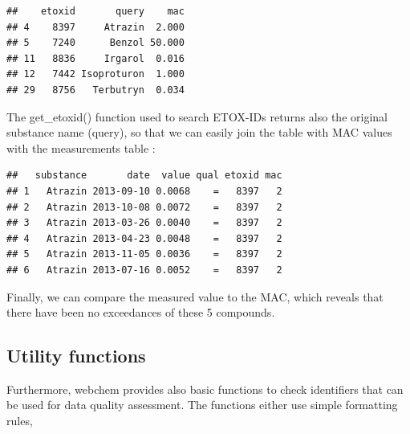 \begin{knitrout}
\color{fgcolor}\begin{kframe}
\begin{alltt}
 \hlkwb{<-} \hlstd{(ids, ids[}\hlopt{!} \hlopt{&} 
                      \hlstd{(}\hlstd{,} \hlstd{,} \hlstd{)]))}
\end{alltt}
\begin{verbatim}
##    etoxid       query    mac
## 4    8397     Atrazin  2.000
## 5    7240      Benzol 50.000
## 11   8836     Irgarol  0.016
## 12   7442 Isoproturon  1.000
## 29   8756   Terbutryn  0.034
\end{verbatim}
\end{kframe}
\end{knitrout}

The get\_etoxid() function used to search ETOX-IDs returns also the original substance name (query),
so that we can easily join the table with MAC values with the measurements table :
\begin{knitrout}
\color{fgcolor}\begin{kframe}
\begin{alltt}
 \hlkwb{<-}   \hlstd{=} \hlstd{,}  \hlstd{=} \hlstd{)}
\end{alltt}
\begin{verbatim}
##   substance       date  value qual etoxid mac
## 1   Atrazin 2013-09-10 0.0068    =   8397   2
## 2   Atrazin 2013-10-08 0.0072    =   8397   2
## 3   Atrazin 2013-03-26 0.0040    =   8397   2
## 4   Atrazin 2013-04-23 0.0048    =   8397   2
## 5   Atrazin 2013-11-05 0.0036    =   8397   2
## 6   Atrazin 2013-07-16 0.0052    =   8397   2
\end{verbatim}
\end{kframe}
\end{knitrout}

Finally, we can compare the measured value to the MAC, which reveals that there have been no exceedances of these 5 compounds.




\subsection[Utility functions]{Utility functions}
Furthermore, webchem provides also basic functions to check identifiers that can be used for data quality assessment.
The functions either use simple formatting rules,

